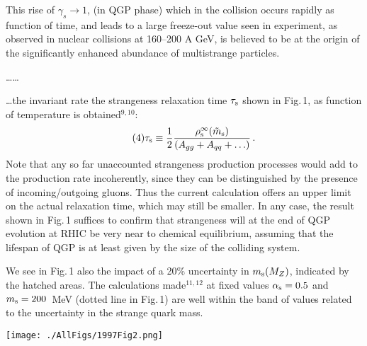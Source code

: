 \begin{mdframed}[linecolor=gray,roundcorner=12pt,backgroundcolor=Dandelion!15,linewidth=1pt,leftmargin=0cm,rightmargin=0cm,topline=true,bottomline=true,skipabove=12pt]
This rise of $\gamma_s\to 1$, (in QGP phase) which in the collision occurs rapidly as function of time, and leads to a large freeze-out value seen in experiment, as observed in nuclear collisions at 160--200 A GeV, is believed to be at the origin of the significantly enhanced abundance of multistrange particles.

\ldots\ldots


\ldots the invariant rate the strangeness relaxation time
$\tau_{\rm s}$ shown in Fig.\,1, as function of
temperature is obtained$^{9,10}$:
\begin{equation}\tag{4}\label{tauss}
\tau_{\rm s}\equiv
{1\over 2}{\rho_{\rm s}^\infty(\tilde m_{\rm
s})\over{(A_{gg}+A_{qq}+\ldots)}}\,. 
\end{equation}
Note that any so far unaccounted strangeness production processes would add to the production rate incoherently, since they can be distinguished by the presence of incoming/outgoing gluons. Thus the current calculation offers an upper limit on the actual relaxation time, which may still be smaller. In any case,  the result shown in Fig.\,1   suffices to confirm that strangeness will at the end of QGP evolution at RHIC be very near to chemical equilibrium, assuming that the lifespan of QGP is at least given by the size of the colliding system.

We  see in Fig.\,1 also the impact of a 20\% uncertainty in $m_{\rm s}(M_{{Z}})$, indicated by the hatched areas. The calculations made$^{11,12}$ at fixed values $\alpha_{\rm s}=0.5$ and $m_{\rm s}=200$~MeV (dotted line in Fig.\,1) are well within the band of values related to the uncertainty in the strange quark mass. \\
 
\centerline{
\texttt{[image: ./AllFigs/1997Fig2.png]} 
}


\end{mdframed}
